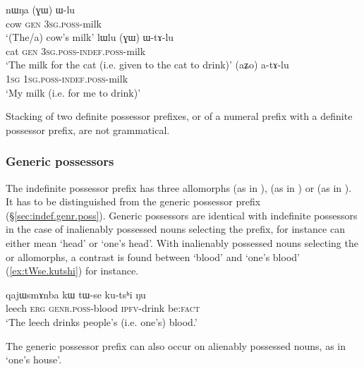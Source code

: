 \begin{exe}
\ex 
\begin{xlist}
\ex \label{ex:nWNa.Wlu}
\gll nɯŋa (ɣɯ) ɯ-lu \\
cow \textsc{gen} \textsc{3sg}.\textsc{poss}-milk \\
\glt `(The/a) cow's milk' 
\ex \label{ex:lWlu.WtAlu}
\gll lɯlu (ɣɯ) ɯ-tɤ-lu \\
cat \textsc{gen} \textsc{3sg}.\textsc{poss}-\textsc{indef}.\textsc{poss}-milk \\
\glt `The milk for the cat (i.e. given to the cat to drink)' 
\ex \label{ex:atAlu}
\gll (aʑo) a-tɤ-lu \\
\textsc{1sg} \textsc{1sg}.\textsc{poss}-\textsc{indef}.\textsc{poss}-milk \\
\glt `My milk (i.e. for me to drink)' 
\end{xlist}
\end{exe}

Stacking of two definite possessor prefixes, or of a numeral prefix with a definite possessor prefix, are not grammatical.

\subsubsection{Generic possessors}
The indefinite possessor prefix has three allomorphs  (as in ),  (as in ) or  (as in ). It has to be distinguished from the generic possessor prefix  (§\ref{sec:indef.genr.poss}). Generic possessors are identical with indefinite possessors in the case of inalienably possessed nouns selecting the  prefix, for instance  can either mean `head' or `one's head'. With inalienably possessed nouns selecting the  or  allomorphs, a contrast is found between  `blood' and  `one's blood' (\ref{ex:tWse.kutshi}) for instance.

\begin{exe}
\ex \label{ex:tWse.kutshi}
\gll qajɯsmɤnba kɯ tɯ-se ku-tsʰi ŋu \\
leech \textsc{erg} \textsc{genr}.\textsc{poss}-blood \textsc{ipfv}-drink be:\textsc{fact} \\
\glt `The leech drinks people's (i.e. one's) blood.' 
\end{exe}

The generic possessor prefix can also occur on alienably possessed nouns, as in  `one's house'. 

